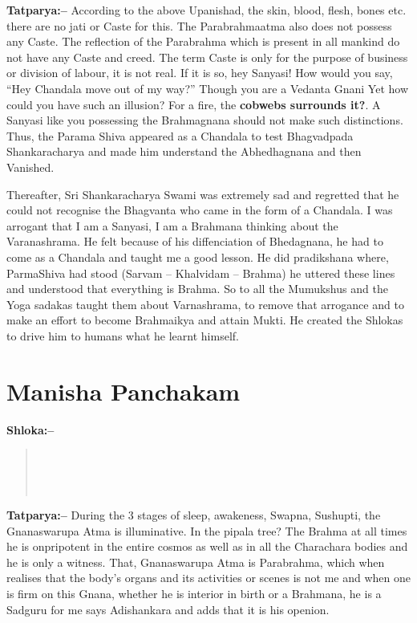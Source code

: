 \textbf{Tatparya:–} According to the above Upanishad, the skin, blood, flesh, bones etc. there are no jati or Caste for this. The Parabrahmaatma also does not possess any Caste. The reflection of the Parabrahma which is present in all mankind do not have any Caste and creed. The term Caste is only for the purpose of business or division of labour, it is not real. If it is so, hey Sanyasi! How would you say, “Hey Chandala move out of my way?” Though you are a Vedanta Gnani Yet how could you have such an illusion? For a fire, the \textbf{cobwebs surrounds it?}. A Sanyasi like you possessing the Brahmagnana should not make such distinctions. Thus, the Parama Shiva appeared as a Chandala to test Bhagvadpada Shankaracharya and made him understand the Abhedhagnana and then Vanished.

Thereafter, Sri Shankaracharya Swami was extremely sad and regretted that he could not recognise the Bhagvanta who came in the form of a Chandala. I was arrogant that I am a Sanyasi, I am a Brahmana thinking about the Varanashrama. He felt because of his diffenciation of Bhedagnana, he had to come as a Chandala and taught me a good lesson. He did pradikshana where, ParmaShiva had stood (Sarvam – Khalvidam – Brahma) he uttered these lines and understood that everything is Brahma. So to all the Mumukshus and the Yoga sadakas taught them about Varnashrama, to remove that arrogance and to make an effort to become Brahmaikya and attain Mukti. He created the Shlokas to drive him to humans what he learnt himself.

\chapter{Manisha Panchakam}

\textbf{Shloka:–}

\begin{verse}
 \\\\\\ 
\end{verse}

\textbf{Tatparya:–} During the 3 stages of sleep, awakeness, Swapna, Sushupti, the Gnanaswarupa Atma is illuminative. In the pipala tree? The Brahma at all times he is onpripotent in the entire cosmos as well as in all the Charachara bodies and he is only a witness. That, Gnanaswarupa Atma is Parabrahma, which when realises that the body's organs and its activities or scenes is not me and when one is firm on this Gnana, whether he is interior in birth or a Brahmana, he is a Sadguru for me says Adishankara and adds that it is his openion.

